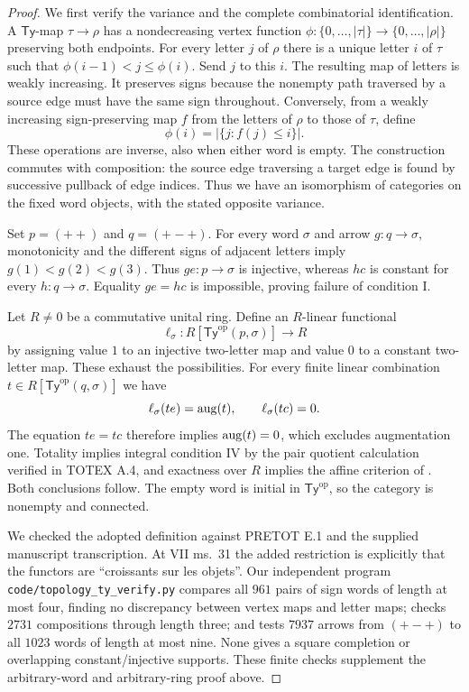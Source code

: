 \begin{proof}
We first verify the variance and the complete combinatorial
identification. A $\mathsf{Ty}$-map $\tau\to\rho$ has a
nondecreasing vertex function
$\phi:\{0,\ldots,|\tau|\}\to\{0,\ldots,|\rho|\}$ preserving
both endpoints. For every letter $j$ of $\rho$ there is a unique
letter $i$ of $\tau$ such that
$\phi(i-1)<j\leq\phi(i)$. Send $j$ to this $i$.
The resulting map of letters is weakly increasing. It preserves
signs because the nonempty path traversed by a source edge must
have the same sign throughout. Conversely, from a weakly
increasing sign-preserving map $f$ from the letters of $\rho$
to those of $\tau$, define
\[
 \phi(i)=|\{j:f(j)\leq i\}|.
\]
These operations are inverse, also when either word is empty.
The construction commutes with composition: the source edge
traversing a target edge is found by successive pullback of edge
indices. Thus we have an isomorphism of categories on the fixed
word objects, with the stated opposite variance.

Set $p=(++)$ and $q=(+-+)$. For every word $\sigma$ and arrow
$g:q\to\sigma$, monotonicity and the different signs of
adjacent letters imply
$g(1)<g(2)<g(3)$. Thus $ge:p\to\sigma$ is injective,
whereas $hc$ is constant for every $h:q\to\sigma$. Equality
$ge=hc$ is impossible, proving failure of condition I.

Let $R\ne0$ be a commutative unital ring. Define an $R$-linear
functional
\[
 \ell_\sigma:R[\mathsf{Ty}^{\mathrm{op}}(p,\sigma)]\to R
\]
by assigning value $1$ to an injective two-letter map and value
$0$ to a constant two-letter map. These exhaust the possibilities.
For every finite linear combination
$t\in R[\mathsf{Ty}^{\mathrm{op}}(q,\sigma)]$ we have
\[
 \ell_\sigma(te)=\operatorname{aug}(t),\qquad \ell_\sigma(tc)=0.
\]
The equation $te=tc$ therefore implies $\operatorname{aug}(t)=0$, which
excludes augmentation one. Totality implies integral condition
IV by the pair quotient calculation verified in TOTEX A.4, and
exactness over $R$ implies the affine criterion of
\citet[Theorem 3.1 and the remark on p.~296]{IsbellMitchell1976}.
Both conclusions follow. The empty word is initial in
$\mathsf{Ty}^{\mathrm{op}}$, so the category is nonempty and
connected.

We checked the adopted definition against PRETOT E.1 and the
supplied manuscript transcription. At VII ms.~31 the added
restriction is explicitly that the functors are
``croissants sur les objets''. Our independent program
\texttt{code/topology\_ty\_verify.py} compares all $961$ pairs
of sign words of length at most four, finding no discrepancy
between vertex maps and letter maps; checks $2731$ compositions
through length three; and tests $7937$ arrows from $(+-+)$ to
all $1023$ words of length at most nine. None gives a square
completion or overlapping constant/injective supports. These
finite checks supplement the arbitrary-word and arbitrary-ring
proof above.
\end{proof}

